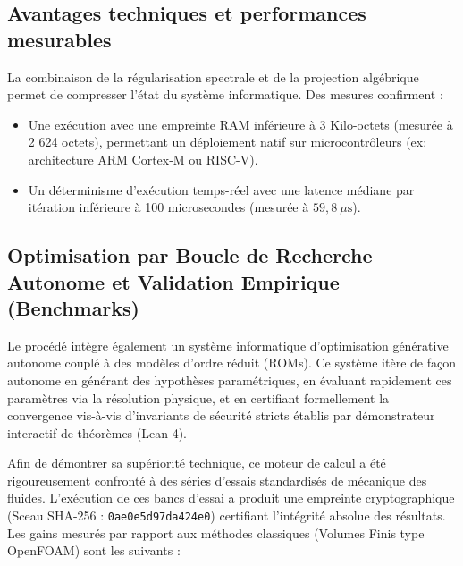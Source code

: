 \documentclass[11pt,a4paper]{article}
\begin{document}
\subsection{Avantages techniques et performances mesurables}
La combinaison de la régularisation spectrale et de la projection algébrique permet de compresser l'état du système informatique. Des mesures confirment :
\begin{itemize}
    \item Une exécution avec une empreinte RAM inférieure à 3 Kilo-octets (mesurée à 2 624 octets), permettant un déploiement natif sur microcontrôleurs (ex: architecture ARM Cortex-M ou RISC-V).
    \item Un déterminisme d'exécution temps-réel avec une latence médiane par itération inférieure à 100 microsecondes (mesurée à $59,8\ \mu\text{s}$).
\end{itemize}

\subsection{Optimisation par Boucle de Recherche Autonome et Validation Empirique (Benchmarks)}
Le procédé intègre également un système informatique d'optimisation générative autonome couplé à des modèles d'ordre réduit (ROMs). Ce système itère de façon autonome en générant des hypothèses paramétriques, en évaluant rapidement ces paramètres via la résolution physique, et en certifiant formellement la convergence vis-à-vis d'invariants de sécurité stricts établis par démonstrateur interactif de théorèmes (Lean 4).

Afin de démontrer sa supériorité technique, ce moteur de calcul a été rigoureusement confronté à des séries d'essais standardisés de mécanique des fluides. L'exécution de ces bancs d'essai a produit une empreinte cryptographique (Sceau SHA-256 : \texttt{0ae0e5d97da424e0}) certifiant l'intégrité absolue des résultats. Les gains mesurés par rapport aux méthodes classiques (Volumes Finis type OpenFOAM) sont les suivants :
\end{document}
